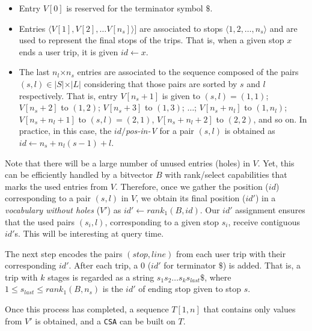 \documentclass[runningheads]{llncs}
\begin{document}
\begin{itemize}
	\item Entry $V[0]$ is reserved for the terminator symbol $\$$.
	\item Entries $\langle V[1],V[2], \dots V[n_s]\rangle]$ are associated to stops $\langle 1,2,\dots, n_s\rangle$ and are used to represent the final stops of the trips. That is, when a given stop $x$ ends a user trip, it is given $id \leftarrow x$.
	\item The last $n_l$$\times$$n_s$ entries are associated to the sequence composed of the pairs $(s,l) \in |S|$$\times$$|L|$ considering that those pairs are sorted by $s$ and $l$ respectively. That is, entry $V[n_s+1]$ is given to $(s,l)=(1,1)$; $V[n_s+2]$ to $(1, 2)$; $V[n_s+3]$ to $(1, 3)$; $\dots$; $V[n_s+n_l]$ to $(1, {n_l})$;  $V[n_s+n_l +1]$ to $(s,l)= (2, 1)$, $V[n_s+n_l +2]$ to $(2, 2)$, and so on. In practice, in this case, the $id/${\em pos-in-V} for a pair $(s,l)$ is obtained as $id \leftarrow  n_s+ n_l(s-1) + l$. 
\end{itemize}

Note that there will be a large number of unused entries (holes) in $V$. Yet, this can be efficiently handled by a bitvector $B$ with rank/select capabilities 
that marks the used entries from $V$. Therefore, once we gather the position ($id$) corresponding to a pair $(s,l)$ in $V$, we obtain its final position ($id'$) in a {\em vocabulary without holes} ($V'$) as $id' \leftarrow rank_1(B,id)$. Our $id'$ assignment ensures that the used pairs $(s_i,l)$, corresponding to a given stop $s_i$, receive contiguous $id'$s. This will be interesting at query time.  

The next step encodes the pairs $(stop,line)$ from each user trip with their corresponding $id'$. After each trip, a $0$ ($id'$ for terminator $\$$) is added. That is, a trip with $k$ stages is regarded as a string $s_1s_2\dots s_{k} s_{last} \$$, where $1\leq s_{last} \leq rank_1(B,n_s)$ is the $id'$ of ending stop given to stop $s$.

Once this process has completed, a sequence $T[1,n]$ that contains only values from $V'$ is obtained, and a \texttt{CSA} can be built on $T$. 
\end{document}
